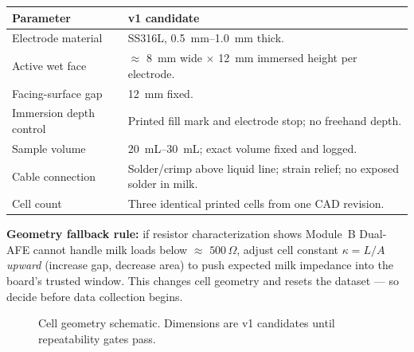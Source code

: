 \documentclass[11pt,a4paper]{article}
\newcommand{\Rohm}[1]{\ensuremath{#1\,\Omega}}
\begin{document}
\begin{xltabular}{\textwidth}{L{45mm}Y}
\toprule
\textbf{Parameter} & \textbf{v1 candidate}\\
\midrule
Electrode material & SS316L, \SIrange{0.5}{1.0}{\milli\meter} thick.\\
Active wet face & $\approx$ \SI{8}{\milli\meter} wide $\times$ \SI{12}{\milli\meter} immersed height per electrode.\\
Facing-surface gap & \SI{12}{\milli\meter} fixed.\\
Immersion depth control & Printed fill mark and electrode stop; no freehand depth.\\
Sample volume & \SIrange{20}{30}{\milli\liter}; exact volume fixed and logged.\\
Cable connection & Solder/crimp above liquid line; strain relief; no exposed solder in milk.\\
Cell count & Three identical printed cells from one CAD revision.\\
\bottomrule
\end{xltabular}

\begin{openbox}
\textbf{Geometry fallback rule:} if resistor characterization shows Module~B Dual-AFE cannot handle milk loads below $\approx$ \Rohm{500}, adjust cell constant $\kappa = L/A$ \emph{upward} (increase gap, decrease area) to push expected milk impedance into the board's trusted window. This changes cell geometry and resets the dataset --- so decide before data collection begins.
\end{openbox}

\begin{figure}[!ht]
\centering
{}
\caption{Cell geometry schematic. Dimensions are v1 candidates until repeatability gates pass.}
\label{fig:cell_geometry}
\end{figure}
\end{document}
